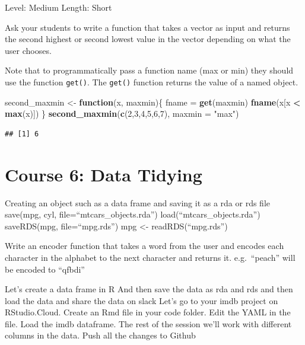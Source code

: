 \documentclass[]{book}
\newenvironment{Shaded}{\begin{snugshade}}{\end{snugshade}}
\newcommand{\ControlFlowTok}[1]{\textcolor[rgb]{0.13,0.29,0.53}{\textbf{#1}}}
\newcommand{\DataTypeTok}[1]{\textcolor[rgb]{0.13,0.29,0.53}{#1}}
\newcommand{\DecValTok}[1]{\textcolor[rgb]{0.00,0.00,0.81}{#1}}
\newcommand{\KeywordTok}[1]{\textcolor[rgb]{0.13,0.29,0.53}{\textbf{#1}}}
\newcommand{\NormalTok}[1]{#1}
\newcommand{\OperatorTok}[1]{\textcolor[rgb]{0.81,0.36,0.00}{\textbf{#1}}}
\newcommand{\StringTok}[1]{\textcolor[rgb]{0.31,0.60,0.02}{#1}}
\begin{document}
Level: Medium
Length: Short

Ask your students to write a function that takes a vector as input and returns the second highest or second lowest value in the vector depending on what the user chooses.

Note that to programmatically pass a function name (max or min) they should use the function \texttt{get()}. The \texttt{get()} function returns the value of a named object.

\begin{Shaded}
\begin{Highlighting}[]
\NormalTok{second_maxmin <-}\StringTok{  }\ControlFlowTok{function}\NormalTok{(x, maxmin)\{}
\NormalTok{    fname =}\StringTok{ }\KeywordTok{get}\NormalTok{(maxmin)}
    \KeywordTok{fname}\NormalTok{(x[x }\OperatorTok{<}\StringTok{ }\KeywordTok{max}\NormalTok{(x)])}
\NormalTok{\}}
\KeywordTok{second_maxmin}\NormalTok{(}\KeywordTok{c}\NormalTok{(}\DecValTok{2}\NormalTok{,}\DecValTok{3}\NormalTok{,}\DecValTok{4}\NormalTok{,}\DecValTok{5}\NormalTok{,}\DecValTok{6}\NormalTok{,}\DecValTok{7}\NormalTok{), }\DataTypeTok{maxmin =} \StringTok{"max"}\NormalTok{)}
\end{Highlighting}
\end{Shaded}

\begin{verbatim}
## [1] 6
\end{verbatim}

\hypertarget{tidying}{%
\chapter*{Course 6: Data Tidying}\label{tidying}}

Creating an object such as a data frame and saving it as a rda or rds file
save(mpg, cyl, file=``mtcars\_objects.rda'')
load(``mtcars\_objects.rda'')
saveRDS(mpg, file=``mpg.rds'')
mpg \textless{}- readRDS(``mpg.rds'')

Write an encoder function that takes a word from the user and encodes each character in the alphabet to the next character and returns it. e.g.~``peach'' will be encoded to ``qfbdi''

Let's create a data frame in R
And then save the data as rda and rds and then load the data and share the data on slack
Let's go to your imdb project on RStudio.Cloud. Create an Rmd file in your code folder.
Edit the YAML in the file.
Load the imdb dataframe. The rest of the session we'll work with different columns in the data.
Push all the changes to Github
\end{document}
